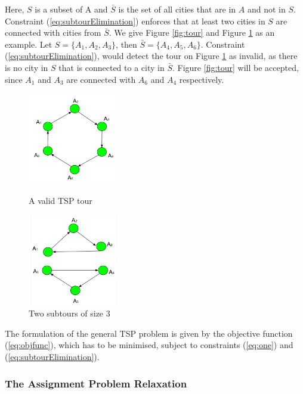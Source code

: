 \documentclass{mprop}
\theoremstyle{definition}
\begin{document}
Here, $S$ is a subset of A and $\bar{S}$ is the set of all cities that are in $A$ and not in $S$. Constraint (\ref{eq:subtourElimination}) enforces that at least two cities in $S$ are connected with cities from $\bar{S}$. We give Figure \ref{fig:tour} and Figure \ref{fig:subtours} as an example. Let $S = \{A_{1},A_{2},A_{3}\}$, then $\bar{S} = \{A_{4},A_{5},A_{6}\}$. Constraint (\ref{eq:subtourElimination}), would detect the tour on Figure \ref{fig:subtours} as invalid, as there is no city in $S$ that is connected to a city in $\bar{S}$. Figure \ref{fig:tour} will be accepted, since $A_{1}$ and $A_{3}$ are connected with $A_{6}$ and $A_{4}$ respectively.

\begin{figure}
\centering
\begin{minipage}{.5\textwidth}
  \centering
  \includegraphics[width=4cm, height=4cm]{images/valid.png}
  \caption{A valid TSP tour}
  \label{fig:tour}
\end{minipage}%
\begin{minipage}{.5\textwidth}
  \centering
  \includegraphics[width=4cm, height=4cm]{images/invalid.png}
  \caption{Two subtours of size 3}
  \label{fig:subtours}
\end{minipage}
\end{figure}

The formulation of the general TSP problem is given by the objective function (\ref{eq:objfunc}), which has to be minimised, subject to constraints (\ref{eq:one}) and (\ref{eq:subtourElimination}).

\subsubsection{The Assignment Problem Relaxation}
\end{document}
